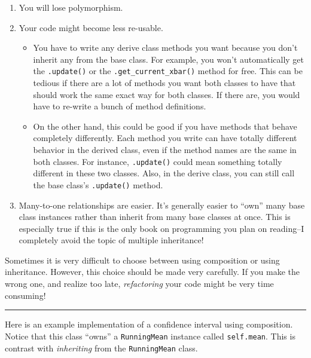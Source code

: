 \documentclass[
  12pt,
  krantz2]{krantz}
\begin{document}
\begin{enumerate}
\def\labelenumi{\arabic{enumi}.}
\item
  You will lose polymorphism.
\item
  Your code might become less re-usable.

  \begin{itemize}
  \item
    You have to write any derive class methods you want because you don't inherit any from the base class. For example, you won't automatically get the \texttt{.update()} or the \texttt{.get\_current\_xbar()} method for free. This can be tedious if there are a lot of methods you want both classes to have that should work the same exact way for both classes. If there are, you would have to re-write a bunch of method definitions.
  \item
    On the other hand, this could be good if you have methods that behave completely differently. Each method you write can have totally different behavior in the derived class, even if the method names are the same in both classes. For instance, \texttt{.update()} could mean something totally different in these two classes. Also, in the derive class, you can still call the base class's \texttt{.update()} method.
  \end{itemize}
\item
  Many-to-one relationships are easier. It's generally easier to ``own'' many base class instances rather than inherit from many base classes at once. This is especially true if this is the only book on programming you plan on reading--I completely avoid the topic of multiple inheritance!
\end{enumerate}

Sometimes it is very difficult to choose between using composition or using inheritance. However, this choice should be made very carefully. If you make the wrong one, and realize too late, \emph{refactoring} your code might be very time consuming!

\begin{center}\rule{0.5\linewidth}{0.5pt}\end{center}

Here is an example implementation of a confidence interval using composition. Notice that this class ``owns'' a \texttt{RunningMean} instance called \texttt{self.mean}. This is contrast with \emph{inheriting} from the \texttt{RunningMean} class.
\end{document}
